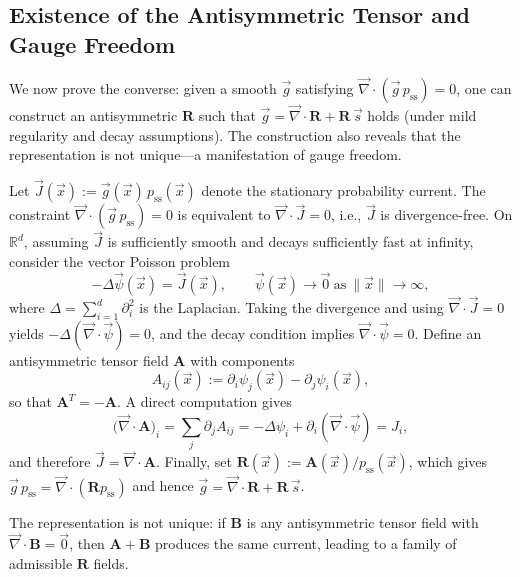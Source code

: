 \documentclass[%
  prl,
  reprint,
  amsmath,
  amssymb,
  aps
]{revtex4-2}
\newcommand{\vvec}[1]{\vec{#1}}
\begin{document}
\subsection{Existence of the Antisymmetric Tensor and Gauge Freedom}
\label{appendix:R_existence}

We now prove the converse: given a smooth $\vvec{g}$ satisfying $\vvec{\nabla}\cdot(\vvec{g}\,p_{\mathrm{ss}})=0$, one can construct an antisymmetric $\bm{R}$ such that $\vvec{g}=\vvec{\nabla}\cdot\bm{R}+\bm{R}\,\vvec{s}$ holds (under mild regularity and decay assumptions). The construction also reveals that the representation is not unique---a manifestation of gauge freedom.

Let $\vvec{J}(\vvec{x}) := \vvec{g}(\vvec{x})\,p_{\mathrm{ss}}(\vvec{x})$ denote the stationary probability current. The constraint $\vvec{\nabla}\cdot(\vvec{g}\,p_{\mathrm{ss}})=0$ is equivalent to $\vvec{\nabla}\cdot\vvec{J}=0$, i.e., $\vvec{J}$ is divergence-free. On $\mathbb{R}^d$, assuming $\vvec{J}$ is sufficiently smooth and decays sufficiently fast at infinity, consider the vector Poisson problem
\begin{equation}
-\Delta \vvec{\psi}(\vvec{x}) = \vvec{J}(\vvec{x}), \qquad \vvec{\psi}(\vvec{x})\to \vvec{0}\ \text{as}\ \|\vvec{x}\|\to\infty,
\end{equation}
where $\Delta=\sum_{i=1}^d \partial_i^2$ is the Laplacian. Taking the divergence and using $\vvec{\nabla}\cdot\vvec{J}=0$ yields $-\Delta(\vvec{\nabla}\cdot\vvec{\psi})=0$, and the decay condition implies $\vvec{\nabla}\cdot\vvec{\psi}=0$. Define an antisymmetric tensor field $\bm{A}$ with components
\begin{equation}
A_{ij}(\vvec{x}) := \partial_i \psi_j(\vvec{x}) - \partial_j \psi_i(\vvec{x}),
\end{equation}
so that $\bm{A}^T=-\bm{A}$. A direct computation gives
\begin{equation}
\bigl(\vvec{\nabla}\cdot\bm{A}\bigr)_i
=\sum_j \partial_j A_{ij}
=-\Delta \psi_i + \partial_i(\vvec{\nabla}\cdot\vvec{\psi})
=J_i,
\end{equation}
and therefore $\vvec{J}=\vvec{\nabla}\cdot\bm{A}$. Finally, set $\bm{R}(\vvec{x}) := \bm{A}(\vvec{x})/p_{\mathrm{ss}}(\vvec{x})$, which gives $\vvec{g}\,p_{\mathrm{ss}}=\vvec{\nabla}\cdot(\bm{R}p_{\mathrm{ss}})$ and hence $\vvec{g}=\vvec{\nabla}\cdot\bm{R}+\bm{R}\,\vvec{s}$.

The representation is not unique: if $\bm{B}$ is any antisymmetric tensor field with $\vvec{\nabla}\cdot\bm{B}=\vvec{0}$, then $\bm{A}+\bm{B}$ produces the same current, leading to a family of admissible $\bm{R}$ fields.
\end{document}
